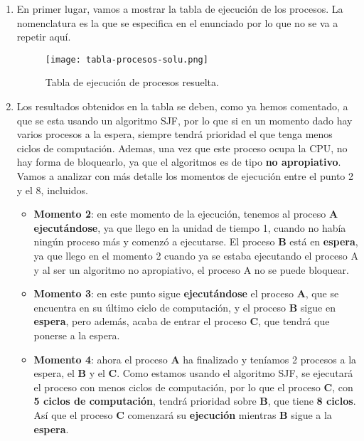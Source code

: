 \begin{enumerate}
    \item En primer lugar, vamos a mostrar la tabla de ejecución de los procesos. La nomenclatura es la que se especifica en el enunciado por lo que no se va a repetir aquí.

    \begin{figure}[ht]
        \centering
        \texttt{[image: tabla-procesos-solu.png]}
        \caption{Tabla de ejecución de procesos resuelta.}
    \end{figure}

    \item Los resultados obtenidos en la tabla se deben, como ya hemos comentado, a que se esta usando un algoritmo SJF, por lo que si en un momento dado hay varios procesos a la espera, siempre tendrá prioridad el que tenga menos ciclos de computación. Ademas, una vez que este proceso ocupa la CPU, no hay forma de bloquearlo, ya que el algoritmos es de tipo \textbf{no apropiativo}. Vamos a analizar con más detalle los momentos de ejecución entre el punto 2 y el 8, incluidos.

    \begin{itemize}
        \item \textbf{Momento 2}: en este momento de la ejecución, tenemos al proceso \textbf{A ejecutándose}, ya que llego en la unidad de tiempo 1, cuando no había ningún proceso más y comenzó a ejecutarse. El proceso \textbf{B} está en \textbf{espera}, ya que llego en el momento 2 cuando ya se estaba ejecutando el proceso A y al ser un algoritmo no apropiativo, el proceso A no se puede bloquear.

        \item \textbf{Momento 3}: en este punto sigue \textbf{ejecutándose} el proceso \textbf{A}, que se encuentra en su último ciclo de computación, y el proceso \textbf{B} sigue en \textbf{espera}, pero además, acaba de entrar el proceso \textbf{C}, que tendrá que ponerse a la espera.

        \item \textbf{Momento 4}: ahora el proceso \textbf{A} ha finalizado y teníamos 2 procesos a la espera, el \textbf{B} y el \textbf{C}. Como estamos usando el algoritmo SJF, se ejecutará el proceso con menos ciclos de computación, por lo que el proceso \textbf{C}, con \textbf{5 ciclos de computación}, tendrá prioridad sobre \textbf{B}, que tiene \textbf{8 ciclos}. Así que el proceso \textbf{C} comenzará su \textbf{ejecución} mientras \textbf{B} sigue a la \textbf{espera}.


\end{itemize}
\end{enumerate}
